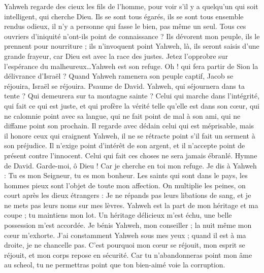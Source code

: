 \begin{multicols}{2}
Yahweh regarde des cieux les fils de l’homme, pour voir s'il y a quelqu'un qui soit intelligent, qui cherche Dieu.
Ils se sont tous égarés, ils se sont tous ensemble rendus odieux, il n'y a personne qui fasse le bien, pas même un seul.
Tous ces ouvriers d'iniquité n'ont-ils point de connaissance ? Ils dévorent mon peuple, ils le prennent pour nourriture ; ils n'invoquent point Yahweh,
là, ils seront saisis d'une grande frayeur, car Dieu est avec la race des justes.
Jetez l’opprobre sur l’espérance du malheureux…Yahweh est son refuge.
Oh ! qui fera partir de Sion la délivrance d'Israël ? Quand Yahweh ramenera son peuple captif, Jacob se réjouira, Israël se réjouira.
\VerseOne{}Psaume de David. Yahweh, qui séjournera dans ta tente ? Qui demeurera sur ta montagne sainte ?
Celui qui marche dans l'intégrité, qui fait ce qui est juste, et qui profère la vérité telle qu'elle est dans son cœur,
qui ne calomnie point avec sa langue, qui ne fait point de mal à son ami, qui ne diffame point son prochain.
Il regarde avec dédain celui qui est méprisable, mais il honore ceux qui craignent Yahweh, il ne se rétracte point s’il fait un serment à son préjudice.
Il n’exige point d’intérêt de son argent, et il n’accepte point de présent contre l'innocent. Celui qui fait ces choses ne sera jamais ébranlé.
\VerseOne{}Hymne de David. Garde-moi, ô Dieu ! Car je cherche en toi mon refuge.
Je dis à Yahweh : Tu es mon Seigneur, tu es mon bonheur.
Les saints qui sont dans le pays, les hommes pieux sont l’objet de toute mon affection.
On multiplie les peines, on court après les dieux étrangers : Je ne répands pas leurs libations de sang, et je ne mets pas leurs noms sur mes lèvres.
Yahweh est la part de mon héritage et ma coupe ; tu maintiens mon lot.
Un héritage délicieux m’est échu, une belle possession m’est accordée.
Je bénis Yahweh, mon conseiller ; la nuit même mon cœur m’exhorte.
J’ai constamment Yahweh sous mes yeux ; quand il est à ma droite, je ne chancelle pas.
C'est pourquoi mon cœur se réjouit, mon esprit se réjouit, et mon corps repose en sécurité.
Car tu n'abandonneras point mon âme au scheol, tu ne permettras point que ton bien-aimé voie la corruption.

\end{multicols}
